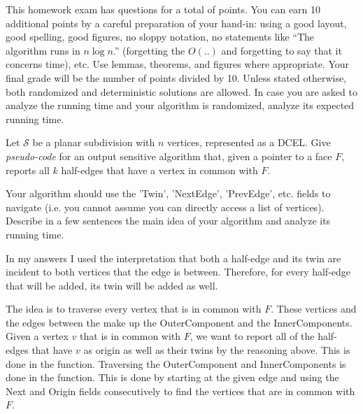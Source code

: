 \documentclass{article}
\title{\mytitle}
\date{\textbf{Deadline: } \deadline}
\author{\student}
\newcommand{\withpoints}[1]{%
  \addtocounter{pointscounter}{#1} \printpoints{#1}
}
\newcommand{\printpoints}[1]{%
   \ifthenelse{#1 = 0}
              {}
              {\textit{(#1 points)}}\mbox{}
}
\newenvironment{question}[1][0]{\begin{tcolorbox}[parbox=false
                                      ,breakable=true
                                      ,enhanced jigsaw
                                      ,title=\bfseries Question
                                      \stepcounter{questionscounter}\arabic{questionscounter}
                                      \withpoints{#1}]
                         }
                         {\end{tcolorbox}}
\newcommand{\numquestions}{\total{questionscounter}}
\newcommand{\numpoints}{\total{pointscounter}}
\begin{document}
\maketitle
\thispagestyle{fancy}
  \noindent
  This homework exam has \numquestions\xspace questions for a total of
  \numpoints\xspace points. You can earn 10 additional points by a
  careful preparation of your hand-in: using a good layout, good
  spelling, good figures, no sloppy notation, no statements like ``The
  algorithm runs in $n\log n$.''  (forgetting the $O(..)$ and
  forgetting to say that it concerns time), etc. Use lemmas, theorems,
  and figures where appropriate. Your final grade will be the number
  of points divided by 10. Unless stated otherwise, both randomized
  and deterministic solutions are allowed. In case you are asked to
  analyze the running time and your algorithm is randomized, analyze
  its expected running time.

  \begin{question}[20] Let $\mathcal{S}$ be a planar subdivision with
    $n$ vertices, represented as a DCEL. Give \emph{pseudo-code} for
    an output sensitive algorithm that, given a pointer to a face $F$,
    reports all $k$ half-edges that have a vertex in common with $F$.

    Your algorithm should use the 'Twin', 'NextEdge', 'PrevEdge',
    etc. fields to navigate (i.e. you cannot assume you can directly
    access a list of vertices). Describe in a few sentences the main
    idea of your algorithm and analyze its running time.
  \end{question}

  In my answers I used the interpretation that both a half-edge and its twin are incident to both vertices that the edge is between.
  Therefore, for every half-edge that will be added, its twin will be added as well. 

  The idea is to traverse every vertex that is in common with $F$. These vertices and the edges between the make up the OuterComponent and the InnerComponents. 
  Given a vertex $v$ that is in common with $F$, we want to report all of the half-edges that have $v$ as origin as well as their twins by the reasoning above.
  This is done in the  function. 
  Traversing the OuterComponent and InnerComponents is done in the  function. 
  This is done by starting at the given edge and using the Next and Origin fields consecutively to find the vertices that are in common with $F$. 
\end{document}
